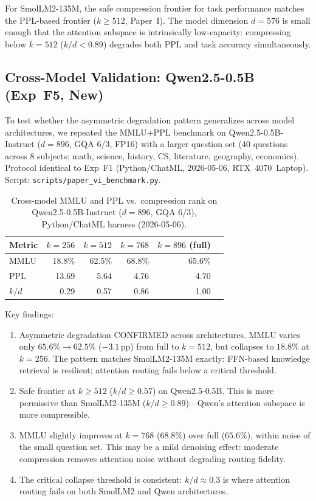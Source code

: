 \documentclass[11pt]{article}
\begin{document}
For SmolLM2-135M, the safe compression frontier for task performance
matches the PPL-based frontier ($k{\ge}512$, Paper~I).  The model
dimension $d{=}576$ is small enough that the attention subspace is
intrinsically low-capacity: compressing below $k{=}512$ ($k/d{<}0.89$)
degrades both PPL and task accuracy simultaneously.

\subsection{Cross-Model Validation: Qwen2.5-0.5B (Exp~F5, New)}

To test whether the asymmetric degradation pattern generalizes across
model architectures, we repeated the MMLU+PPL benchmark on
Qwen2.5-0.5B-Instruct ($d{=}896$, GQA 6/3, FP16) with a larger
question set (40 questions across 8 subjects: math, science, history,
CS, literature, geography, economics).  Protocol identical to Exp~F1
(Python/ChatML, 2026-05-06, RTX~4070~Laptop).
Script: \texttt{scripts/paper\_vi\_benchmark.py}.

\begin{table}[h]\centering\small
\caption{Cross-model MMLU and PPL vs.\ compression rank on
Qwen2.5-0.5B-Instruct ($d{=}896$, GQA 6/3), Python/ChatML harness (2026-05-06).}
\label{tab:f5-qwen}
\begin{tabular}{@{}lrrrrr@{}}
\toprule
Metric  & $k{=}256$ & $k{=}512$ & $k{=}768$ & $k{=}896$ (full) \\
\midrule
MMLU    & 18.8\% & 62.5\% & 68.8\% & 65.6\% \\
PPL     & 13.69 & 5.64  & 4.76  & 4.70 \\
$k/d$   & 0.29  & 0.57  & 0.86  & 1.00 \\
\bottomrule
\end{tabular}
\end{table}

Key findings:
\begin{enumerate}
\item Asymmetric degradation CONFIRMED across architectures.  MMLU
      varies only $65.6\%{\to}62.5\%$ ($-3.1$\,pp) from full to
      $k{=}512$, but collapses to $18.8\%$ at $k{=}256$.  The pattern
      matches SmolLM2-135M exactly: FFN-based knowledge retrieval is
      resilient; attention routing fails below a critical threshold.
\item Safe frontier at $k{\ge}512$ ($k/d{\ge}0.57$) on Qwen2.5-0.5B.
      This is more permissive than SmolLM2-135M
      ($k/d{\ge}0.89$)---Qwen's attention subspace is more compressible.
\item MMLU slightly improves at $k{=}768$ ($68.8\%$) over
      full ($65.6\%$), within noise of the small question set.  This
      may be a mild denoising effect: moderate compression removes
      attention noise without degrading routing fidelity.
\item The critical collapse threshold is consistent:
      $k/d \approx 0.3$ is where attention routing fails on both
      SmolLM2 and Qwen architectures.
\end{enumerate}
\end{document}
